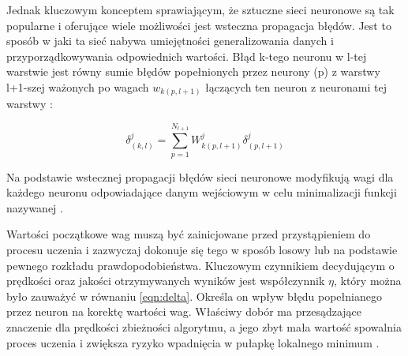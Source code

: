 Jednak kluczowym konceptem sprawiającym, że sztuczne sieci neuronowe są tak popularne i oferujące wiele możliwości jest wsteczna propagacja błędów. Jest to sposób w jaki ta sieć nabywa umiejętności generalizowania danych i przyporządkowywania odpowiednich wartości. Błąd k-tego neuronu w l-tej warstwie jest równy sumie błędów popełnionych przez neurony (p) z warstwy l+1-szej ważonych po wagach $w_{k(p,l+1)}$ łączących ten neuron z neuronami tej warstwy \cite{Prezentacja:SNN}: 

\[
\delta_{(k,l)}^{j} = \sum_{p=1}^{N_{l+1}} W^{j}_{k(p, l+1)} \delta_{(p,l+1)}^{j}
\]

Na podstawie wstecznej propagacji błędów sieci neuronowe modyfikują wagi dla każdego neuronu odpowiadające danym wejściowym w celu minimalizacji funkcji nazywanej .

Wartości początkowe wag muszą być zainicjowane przed przystąpieniem do procesu uczenia i zazwyczaj dokonuje się tego w sposób losowy lub na podstawie pewnego rozkładu prawdopodobieństwa. Kluczowym czynnikiem decydującym o prędkości oraz jakości otrzymywanych wyników jest współczynnik $\eta$, który można było zauważyć w równaniu \ref{eqn:delta}. Określa on wpływ błędu popełnianego przez neuron na korektę wartości wag. Właściwy dobór ma przesądzające znaczenie dla prędkości zbieżności algorytmu, a jego zbyt mała wartość spowalnia proces uczenia i zwiększa ryzyko
wpadnięcia w pułapkę lokalnego minimum \cite{Prezentacja:SNN}.

